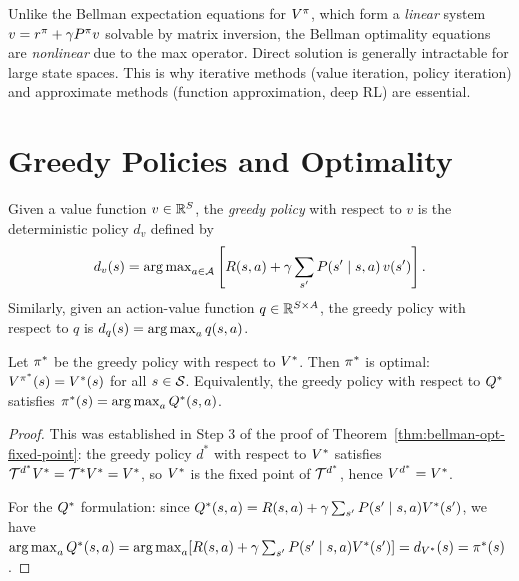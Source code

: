 \documentclass[11pt,a4paper]{article}
\begin{document}
\begin{warning}[title={Bellman Optimality Equations Are Nonlinear}]
Unlike the Bellman expectation equations for $V^{\pi}$, which form a
\emph{linear} system $v = r^\pi + \gamma P^\pi v$ solvable
by matrix inversion, the Bellman optimality equations are
\emph{nonlinear} due to the max operator. Direct solution is
generally intractable for large state spaces. This is why iterative
methods (value iteration, policy iteration) and approximate methods
(function approximation, deep RL) are essential.
\end{warning}


\section{Greedy Policies and Optimality}
\label{sec:greedy-optimality}

\begin{definition}
\label{def:greedy-policy}
Given a value function $v \in \mathbb{R}^S$, the \emph{greedy policy} with
respect to $v$ is the deterministic policy $d_v$ defined by
\[
    d_v(s) = \operatorname{arg\,max}_{a \in \mathcal{A}}
    \left[ R(s,a) + \gamma \sum_{s'} P(s' \mid s,a)\, v(s')
    \right].
\]
Similarly, given an action-value function $q \in \mathbb{R}^{S \times A}$,
the greedy policy with respect to $q$ is $d_q(s) = \operatorname{arg\,max}_a q(s,a)$.
\end{definition}

\begin{theorem}
\label{thm:greedy-optimal}
Let $\pi^*$ be the greedy policy with respect to $V^*$. Then
$\pi^*$ is optimal: $V^{\pi^*}(s) = V^*(s)$ for all
$s \in \mathcal{S}$. Equivalently, the greedy policy with respect to
$Q^*$ satisfies $\pi^*(s) = \operatorname{arg\,max}_a Q^*(s,a)$.
\end{theorem}

\begin{proof}
This was established in Step 3 of the proof of
Theorem~\ref{thm:bellman-opt-fixed-point}: the greedy policy $d^*$
with respect to $V^*$ satisfies
$\mathcal{T}^{d^*} V^* = \mathcal{T}^* V^* = V^*$, so $V^*$
is the fixed point of $\mathcal{T}^{d^*}$, hence
$V^{d^*} = V^*$.

For the $Q^*$ formulation: since
$Q^*(s,a) = R(s,a) + \gamma \sum_{s'} P(s' \mid s,a)
V^*(s')$, we have
$\operatorname{arg\,max}_a Q^*(s,a) = \operatorname{arg\,max}_a [R(s,a) + \gamma \sum_{s'}
P(s' \mid s,a) V^*(s')] = d_{V^*}(s) = \pi^*(s)$.
\end{proof}
\end{document}
